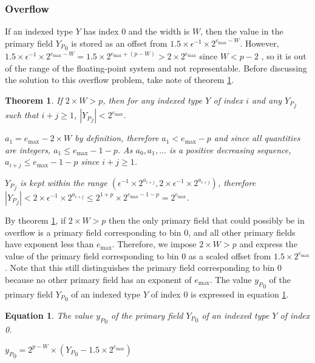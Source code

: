\documentclass[12pt]{article}
\providecommand{\max}{\ensuremath{\text{max}}}
\theoremstyle{plain}
\newtheorem{thm}{Theorem}[section]
\newtheorem{eq}{Equation}[section]
\begin{document}
    \subsubsection{Overflow}
      \label{sec:overflow}
      If an indexed type $Y$ has index 0 and the width is $W$, then the value in the primary field ${Y_P}_0$ is stored as an offset from $1.5\times\epsilon^{-1}\times2^{e_{\max} - W}$. However, $1.5\times\epsilon^{-1}\times2^{e_{\max} - W} = 1.5 \times 2^{e_{\max} + (p - W)} > 2 \times 2^{e_{\max}}$ since $W < p - 2$ \cite{repsum}, so it is out of the range of the floating-point system and not representable. Before discussing the solution to this overflow problem, take note of theorem \ref{thm:overflow}.
      \begin{thm}
        If $2\times W > p$, then for any indexed type $Y$ of index $i$ and any ${Y_P}_j$ such that $i + j \geq 1$, $|{Y_P}_j| < 2^{e_{\max}}$.

        $a_1 = e_{\max} - 2\times W$ by definition, therefore $a_1 < e_{\max} - p$ and since all quantities are integers, $a_1 \leq e_{\max} - 1 - p$. As $a_0, a_1, ...$ is a positive decreasing sequence, $a_{i + j} \leq e_{\max} - 1 - p$ since $i + j \geq 1$.

        ${Y_P}_j$ is kept within the range $(\epsilon^{-1} \times 2^{a_{i + j}}, 2 \times \epsilon^{-1} \times 2^{a_{i + j}})$, therefore
        $|{Y_P}_j| < 2 \times \epsilon^{-1} \times 2^{a_{i + j}} \leq 2^{1 + p} \times 2^{e_{\max} - 1 - p} = 2^{e_{\max}}$.

        \label{thm:overflow}
      \end{thm}
      By theorem \ref{thm:overflow}, if $2\times W > p$ then the only primary field that could possibly be in overflow is a primary field corresponding to bin 0, and all other primary fields have exponent less than $e_{\max}$. Therefore, we impose $2\times W > p$ and express the value of the primary field corresponding to bin 0 as a scaled offset from $1.5\times2^{e_{\max}}$. Note that this still distinguishes the primary field corresponding to bin 0 because no other primary field has an exponent of $e_{\max}$. The value ${y_P}_0$ of the primary field ${Y_P}_0$ of an indexed type $Y$ of index 0 is expressed in equation \ref{eq:pri0}.
      \begin{eq} The value ${y_P}_0$ of the primary field ${Y_P}_0$ of an indexed type $Y$ of index 0.

        ${y_P}_0 = 2^{p - W}\times({Y_P}_0 - 1.5\times2^{e_{\max}})$
        \label{eq:pri0}
      \end{eq}
\end{document}

